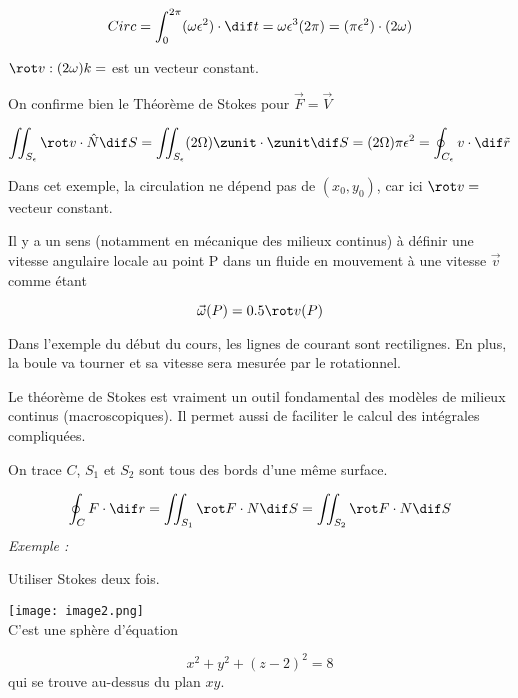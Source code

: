 \[Circ = \int_0^{2\pi} ( \omega \epsilon ^2 )\cdot \dif t = \omega \epsilon^3 ( 2 \pi ) = (\pi \epsilon^2 )\cdot ( 2 \omega ) \]

\begin{myrem}
$\rot v : ( 2 \omega ) k = $ est un vecteur constant.

On confirme bien le Théorème de Stokes pour $\vec F = \vec V $


\[\iint_{S_{\epsilon}} \rot v \cdot \hat N \dif S = \iint_{S_{\epsilon}} (2\Omega) \zunit \cdot \zunit \dif S = (2 \Omega ) \pi \epsilon ^2 = \oint_{C_{\epsilon}} v\cdot \dif \tilde{r} \]

\end{myrem}

\begin{myrem}


Dans cet exemple, la circulation ne dépend pas de $(x_0,y_0)$, car ici $ \rot v = $ vecteur constant.
\end{myrem}

\begin{myrem}

Il y a un sens (notamment en mécanique des milieux continus) à définir une vitesse angulaire locale au point P dans un fluide en mouvement à une vitesse $\vec v$ comme étant

$$\vec \omega (P) = 0.5 \rot v (P) $$

\end{myrem}

\begin{myrem}
Dans l'exemple du début du cours, les lignes de courant sont rectilignes. En plus, la boule va tourner et sa vitesse sera mesurée par le rotationnel.
\end{myrem}


Le théorème de Stokes est vraiment un outil fondamental des modèles de milieux continus (macroscopiques). Il permet aussi de faciliter le calcul des intégrales compliquées.

On trace $C$, $S_1$ et $S_2$ sont tous des bords d'une même surface.

\[\oint_C F \cdot \dif r = \iint_{S_1}\rot F \cdot N \dif S = \iint_{S_2}\rot F \cdot N \dif S\]
\textit{
Exemple : }

\og Utiliser Stokes deux fois.\fg{}

\texttt{[image: image2.png]}\\%

C'est une sphère d'équation

\[x^2+y^2 + (z-2)^2 =8\] qui se trouve au-dessus du plan $xy$.

